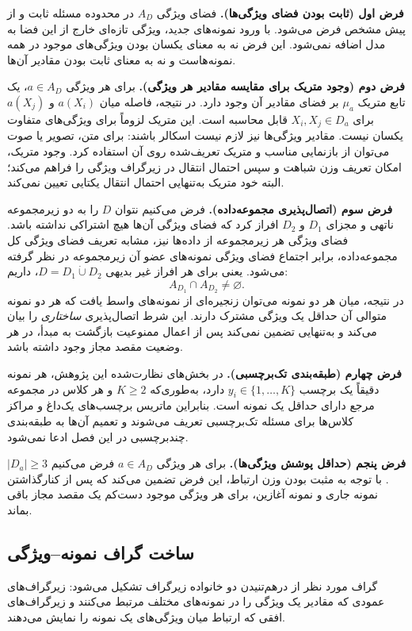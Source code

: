 \medskip
\noindent\textbf{فرض اول (ثابت بودن فضای ویژگی‌ها).}
فضای ویژگی $A_D$ در محدوده مسئله ثابت و از پیش مشخص فرض می‌شود. با ورود نمونه‌های جدید، ویژگی تازه‌ای خارج از این فضا به مدل اضافه نمی‌شود. این فرض نه به معنای یکسان بودن ویژگی‌های موجود در همه نمونه‌هاست و نه به معنای ثابت بودن مقادیر آن‌ها.

\medskip
\noindent\textbf{فرض دوم (وجود متریک برای مقایسه مقادیر هر ویژگی).}
برای هر ویژگی $a\in A_D$، یک تابع متریک $\mu_a$ بر فضای مقادیر آن وجود دارد. در نتیجه، فاصله میان $a(X_i)$ و $a(X_j)$ برای $X_i,X_j\in D_a$ قابل محاسبه است. این متریک لزوماً برای ویژگی‌های متفاوت یکسان نیست. مقادیر ویژگی‌ها نیز لازم نیست اسکالر باشند: برای متن، تصویر یا صوت می‌توان از بازنمایی مناسب و متریک تعریف‌شده روی آن استفاده کرد. وجود متریک، امکان تعریف وزن شباهت و سپس احتمال انتقال در زیرگراف ویژگی را فراهم می‌کند؛ البته خود متریک به‌تنهایی احتمال انتقال یکتایی تعیین نمی‌کند.

\medskip
\noindent\textbf{فرض سوم (اتصال‌پذیری مجموعه‌داده).}
فرض می‌کنیم نتوان $D$ را به دو زیرمجموعه ناتهی و مجزای $D_1$ و $D_2$ افراز کرد که فضای ویژگی آن‌ها هیچ اشتراکی نداشته باشد. فضای ویژگی هر زیرمجموعه از داده‌ها نیز، مشابه تعریف فضای ویژگی کل مجموعه‌داده، برابر اجتماع فضای ویژگی نمونه‌های عضو آن زیرمجموعه در نظر گرفته می‌شود. یعنی برای هر افراز غیر بدیهی $D=D_1\mathbin{\dot\cup}D_2$، داریم:
\begin{equation}\label{eq:ch3-connectivity}
A_{D_1}\cap A_{D_2}\neq\varnothing.
\end{equation}
در نتیجه، میان هر دو نمونه می‌توان زنجیره‌ای از نمونه‌های واسط یافت که هر دو نمونه متوالی آن حداقل یک ویژگی مشترک دارند. این شرط اتصال‌پذیری \emph{ساختاری} را بیان می‌کند و به‌تنهایی تضمین نمی‌کند پس از اعمال ممنوعیت بازگشت به مبدأ، در هر وضعیت مقصد مجاز وجود داشته باشد.

\medskip
\noindent\textbf{فرض چهارم (طبقه‌بندی تک‌برچسبی).}
در بخش‌های نظارت‌شده این پژوهش، هر نمونه دقیقاً یک برچسب $y_i\in\{1,\ldots,K\}$ دارد، به‌طوری‌که $K\ge2$ و هر کلاس در مجموعه مرجع دارای حداقل یک نمونه است. بنابراین ماتریس برچسب‌های یک‌داغ و مراکز کلاس‌ها برای مسئله تک‌برچسبی تعریف می‌شوند و تعمیم آن‌ها به طبقه‌بندی چندبرچسبی در این فصل ادعا نمی‌شود.

\medskip
\noindent\textbf{فرض پنجم (حداقل پوشش ویژگی‌ها).}
برای هر ویژگی $a\in A_D$ فرض می‌کنیم $|D_a|\ge3$. با توجه به مثبت بودن وزن ارتباط، این فرض تضمین می‌کند که پس از کنارگذاشتن نمونه جاری و نمونه آغازین، برای هر ویژگی موجود دست‌کم یک مقصد مجاز باقی بماند.

\subsection{ساخت گراف نمونه--ویژگی}
\label{subsec:ch3-graph}
گراف مورد نظر از درهم‌تنیدن دو خانواده زیرگراف تشکیل می‌شود: زیرگراف‌های عمودی که مقادیر یک ویژگی را در نمونه‌های مختلف مرتبط می‌کنند و زیرگراف‌های افقی که ارتباط میان ویژگی‌های یک نمونه را نمایش می‌دهند.

